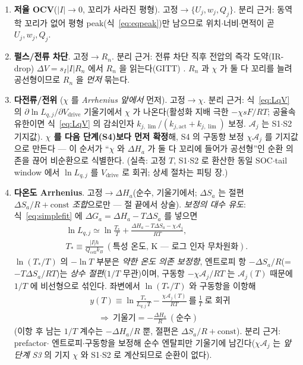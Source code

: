\documentclass[11pt,a4paper]{article}
\newcommand{\drive}{\mathrm{drive}}
\newcommand{\cell}{\mathrm{cell}}
\begin{document}
\begin{enumerate}[label=\textbf{S\arabic*.},leftmargin=2.6em,itemsep=2pt]
\item \textbf{저율 OCV}($|I|\to0$, 꼬리가 사라진 평형). 고정$\to\{U_j,w_j,Q_j\}$. 분리 근거: 동역학 꼬리가
  없어 평형 peak(식~\eqref{eq:eqpeak})만 남으므로 위치$\cdot$너비$\cdot$면적이 곧 $U_j,w_j,Q_j$.
\item \textbf{펄스/전류 차단}. 고정$\to R_n$. 분리 근거: 전류 차단 직후 전압의 즉각 도약(IR-drop) $\Delta V=
  s_I|I|R_n$ 에서 $R_n$ 을 읽는다(GITT) \cite{weppner1977}. $R_n$ 과 $\chi$ 가 둘 다 꼬리를 늘려 공선형이므로
  $R_n$ 을 \emph{먼저} 묶는다.
\item \textbf{다전류/전위} ($\chi$ 를 \emph{Arrhenius 앞에서} 먼저). 고정$\to\chi$. 분리 근거: 식~\eqref{eq:LqV} 의
  $\partial\ln L_{q,j}/\partial V_\drive$ 기울기에서 $\chi$ 가 나온다(활성화 지배 극한 $-\chi sF/RT$; 공율속 유한이면
  식~\eqref{eq:LqV} 의 감쇠인자 $k_{j,\lim}/(k_{j,\mathrm{act}}+k_{j,\lim})$ 보정. $\mathcal A_j$ 는 S1$\cdot$S2 기지값). \textbf{$\chi$ 를 다음 단계(S4)보다 먼저 확정}해, S4 의 구동항 보정 $\chi\mathcal A_j$ 를 기지값으로
  만든다 — 이 순서가 ``$\chi$ 와 $\Delta H_a$ 가 둘 다 꼬리에 들어가 공선형''인 순환 의존을 끊어 비순환으로 식별한다.
  (실측: 고정 $T$, S1$\cdot$S2 로 환산한 동일 SOC$\cdot$tail window 에서 $\ln L_{q,j}$ 를 $V_\drive$ 로 회귀; 상세 절차는 피팅 장.)
\item \textbf{다온도 Arrhenius}. 고정$\to\Delta H_a$(순수, 기울기에서; $\Delta S_a$ 는 절편 $\Delta S_a/R+\text{const}$
  \emph{조합}으로만 — 절 끝에서 상술). \emph{보정의 대수 유도}: 식~\eqref{eq:simplefit}
  에 $\Delta G_a=\Delta H_a-T\Delta S_a$ 를 넣으면
  \begin{equation*}
  \begin{gathered}
  \ln L_{q,j}\simeq\ln\frac{T_*}{T}+\frac{\Delta H_a-T\Delta S_a-\chi\mathcal A_j}{RT},\\[2pt]
  T_*\equiv\frac{|I|h}{Q_\cell k_B}\ (\text{특성 온도, K — 로그 인자 무차원화}).
  \end{gathered}
  \end{equation*}
  $\ln(T_*/T)$ 의 $-\ln T$ 부분은 \emph{약한 온도 의존 보정항}, 엔트로피 항 $-\Delta S_a/R$(=$-T\Delta S_a/RT$)는
  \emph{상수 절편}($1/T$ 무관)이며, 구동항 $-\chi\mathcal A_j/RT$ 는 $\mathcal A_j(T)$ 때문에 $1/T$ 에 비선형으로
  섞인다. 좌변에서 $\ln(T_*/T)$ 와 구동항을 이항해
  \begin{equation}
  \boxed{\;\begin{aligned}
  &y(T)\equiv\ln\frac{T_*}{L_{q,j}\,T}-\frac{\chi\mathcal A_j(T)}{RT}\ \text{를}\ \tfrac1T\ \text{로 회귀}\\[2pt]
  &\quad\Rightarrow\ \text{기울기}=-\frac{\Delta H_a}{R}\ (\text{순수})
  \end{aligned}\;}
  \label{eq:arrhenius}
  \end{equation}
  (이항 후 남는 $1/T$ 계수는 $-\Delta H_a/R$ 뿐, 절편은 $\Delta S_a/R+\text{const}$). 분리 근거: prefactor$\cdot$
  엔트로피$\cdot$구동항을 보정해 순수 엔탈피만 기울기에 남긴다($\chi\mathcal A_j$ 는 \emph{앞 단계 S3} 의 기지 $\chi$ 와
  S1$\cdot$S2 로 계산되므로 순환이 없다).
\end{enumerate}
\end{document}
